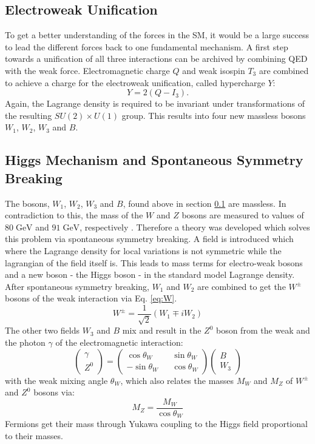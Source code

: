 	\subsection{Electroweak Unification}
	\label{sec:elw}	
	To get a better understanding of the forces in the SM, it would be a large success to lead the different forces back to one fundamental mechanism. A first step towards a unification of all three interactions can be archived by combining QED with the weak force. Electromagnetic charge $Q$ and weak isospin $T_3$ are combined to achieve a charge for the electroweak unification, called hypercharge $Y$:
	\begin{equation}
	Y = 2(Q-I_3).
	\end{equation}
	Again, the Lagrange density is required to be invariant under transformations of the resulting $SU(2) \times U(1)$ group. This results into four new massless bosons $W_1$, $W_2$, $W_3$ and $B$. 
	\subsection{Higgs Mechanism and Spontaneous Symmetry Breaking}
	\label{sec:higgs}
	The bosons, $W_1$, $W_2$, $W_3$ and $B$, found above in section \ref{sec:elw} are massless. In contradiction to this, the mass of the $W$ and $Z$ bosons are measured to values of $80\;\text{GeV}$ and $91\;\text{GeV}$, respectively \cite{pdg2016}. Therefore a theory was developed which solves this problem via spontaneous symmetry breaking. A field is introduced which where the Lagrange density for local variations is not symmetric while the lagrangian of the field itself is. This leads to mass terms for electro-weak bosons and a new boson - the Higgs boson - in the standard model Lagrange density. After spontaneous symmetry breaking, $W_1$ and $W_2$ are combined to get the $W^\pm$ bosons of the weak interaction via Eq. \ref{eq:W}.
	\begin{equation}
	W^\pm = \frac{1}{\sqrt{2}}(W_1 \mp i W_2)
	\label{eq:W}
	\end{equation}
	The other two fields $W_3$ and $B$ mix and result in the $Z^0$ boson from the weak and the photon $\gamma$ of the electromagnetic interaction:
	\begin{equation}
	\begin{pmatrix}\gamma \\ Z^0\end{pmatrix} =
	\begin{pmatrix}
	\cos \theta_W && \sin \theta_W \\
	-\sin \theta_W && \cos \theta_W 
	\end{pmatrix}
	\begin{pmatrix}B \\ W_3\end{pmatrix}
	\label{eq:Z}
	\end{equation}	
	with the weak mixing angle $\theta_W$, which also relates the masses $M_W$ and $M_Z$ of $W^\pm$ and $Z^0$ bosons via:
	\begin{equation}
	M_Z = \frac{M_W}{\cos \theta_W}
	\end{equation}
	Fermions get their mass through Yukawa coupling to the Higgs field proportional to their masses. 
